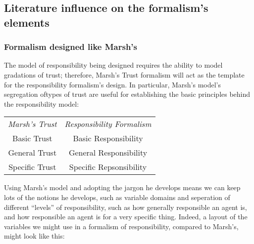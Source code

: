 \subsection{Literature influence on the formalism's elements}
\subsubsection{Formalism designed like Marsh's}
The model of responsibility being designed requires the ability to model gradations of trust; therefore, Marsh's Trust formalism will act as the template for the responsibility formalism's design. In particular, Marsh's model's segregation oftypes of trust are useful for establishing the basic principles behind the responsibility model:

\begin{tabular}{c|c}
    \emph{Marsh's Trust} & \emph{Responsibility Formalism}\\
    Basic Trust & Basic Responsibility\\
    General Trust & General Responsibility\\
    Specific Trust & Specific Repsonsibility\\
\end{tabular}

Using Marsh's model and adopting the jargon he develops means we can keep lots of the notions he develops, such as variable domains and seperation of different ``levels'' of responsibility, such as how generally responsible an agent is, and how responsible an agent is for a very specific thing. Indeed, a layout of the variables we might use in a formalism of responsibility, compared to Marsh's, might look like this:

